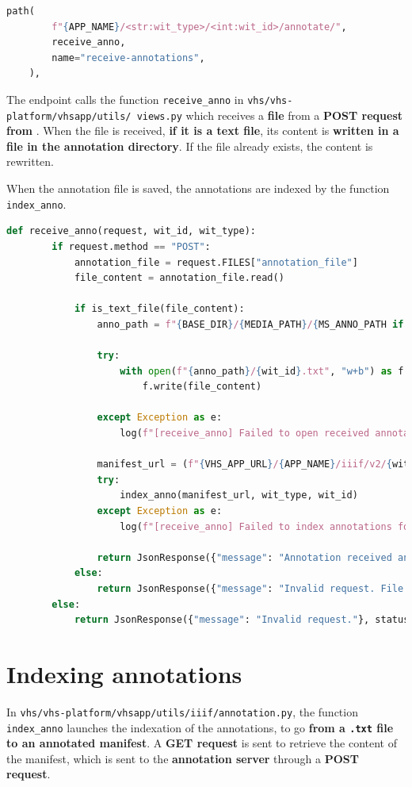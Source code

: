 \begin{lstlisting}[language=Python]
	path(
		f"{APP_NAME}/<str:wit_type>/<int:wit_id>/annotate/",
		receive_anno,
		name="receive-annotations",
	),\end{lstlisting}

The endpoint calls the function \texttt{receive\_anno} in \texttt{vhs/vhs-platform/vhsapp/utils/ views.py} which receives a \textbf{file} from a \textbf{POST request from \exapi}. When the file is received, \textbf{if it is a text file}, its content is \textbf{written in a file in the annotation directory}. If the file already exists, the content is rewritten.

When the annotation file is saved, the annotations are indexed by the function \texttt{index\_anno}. 

\begin{lstlisting}[language=Python]
	def receive_anno(request, wit_id, wit_type):
		if request.method == "POST":
			annotation_file = request.FILES["annotation_file"]
			file_content = annotation_file.read()
		
			if is_text_file(file_content):
				anno_path = f"{BASE_DIR}/{MEDIA_PATH}/{MS_ANNO_PATH if wit_type == 'manuscript' else VOL_ANNO_PATH}"
				
				try:
					with open(f"{anno_path}/{wit_id}.txt", "w+b") as f:
						f.write(file_content)
		
				except Exception as e:
					log(f"[receive_anno] Failed to open received annotations for {wit_type} #{wit_id}: {e}")
		
				manifest_url = (f"{VHS_APP_URL}/{APP_NAME}/iiif/v2/{wit_type}/{wit_id}/manifest.json")
				try:
					index_anno(manifest_url, wit_type, wit_id)
				except Exception as e:
					log(f"[receive_anno] Failed to index annotations for {wit_type} #{wit_id}: {e}")
					
				return JsonResponse({"message": "Annotation received and indexed."})
			else:
				return JsonResponse({"message": "Invalid request. File is not a text file."}, status=400)
		else:
			return JsonResponse({"message": "Invalid request."}, status=400)\end{lstlisting}

\section{Indexing annotations}
In \texttt{vhs/vhs-platform/vhsapp/utils/iiif/annotation.py}, the function \texttt{index\_anno} launches the indexation of the annotations, to go \textbf{from a \texttt{.txt} file to an annotated manifest}. 
A \textbf{GET request} is sent to retrieve the \json content of the manifest, which is sent to the \textbf{annotation server} through a \textbf{POST request}. 

